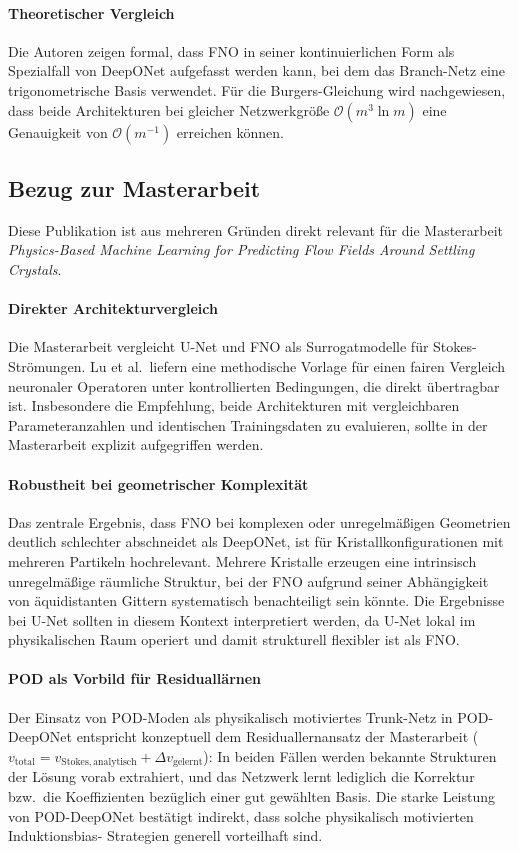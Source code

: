 \documentclass[a4paper,12pt]{article}
\begin{document}
\paragraph{Theoretischer Vergleich} Die Autoren zeigen formal, dass FNO
in seiner kontinuierlichen Form als Spezialfall von DeepONet aufgefasst
werden kann, bei dem das Branch-Netz eine trigonometrische Basis verwendet.
F\"ur die Burgers-Gleichung wird nachgewiesen, dass beide Architekturen bei
gleicher Netzwerkgr\"o\ss{}e $\mathcal{O}(m^3 \ln m)$ eine Genauigkeit von
$\mathcal{O}(m^{-1})$ erreichen k\"onnen.

\subsection*{Bezug zur Masterarbeit}

Diese Publikation ist aus mehreren Gr\"unden direkt relevant f\"ur die
Masterarbeit \emph{Physics-Based Machine Learning for Predicting Flow
Fields Around Settling Crystals}.

\paragraph{Direkter Architekturvergleich} Die Masterarbeit vergleicht
U-Net und FNO als Surrogatmodelle f\"ur Stokes-Str\"omungen. Lu et al.\ liefern
eine methodische Vorlage f\"ur einen fairen Vergleich neuronaler Operatoren
unter kontrollierten Bedingungen, die direkt \"ubertragbar ist. Insbesondere
die Empfehlung, beide Architekturen mit vergleichbaren Parameteranzahlen
und identischen Trainingsdaten zu evaluieren, sollte in der Masterarbeit
explizit aufgegriffen werden.

\paragraph{Robustheit bei geometrischer Komplexit\"at} Das zentrale Ergebnis,
dass FNO bei komplexen oder unregelm\"a\ss{}igen Geometrien deutlich schlechter
abschneidet als DeepONet, ist f\"ur Kristallkonfigurationen mit mehreren
Partikeln hochrelevant. Mehrere Kristalle erzeugen eine intrinsisch
unregelm\"a\ss{}ige r\"aumliche Struktur, bei der FNO aufgrund seiner
Abh\"angigkeit von \"aquidistanten Gittern systematisch benachteiligt sein
k\"onnte. Die Ergebnisse bei U-Net sollten in diesem Kontext interpretiert
werden, da U-Net lokal im physikalischen Raum operiert und damit strukturell
flexibler ist als FNO.

\paragraph{POD als Vorbild f\"ur Residuall\"arnen} Der Einsatz von POD-Moden
als physikalisch motiviertes Trunk-Netz in POD-DeepONet entspricht
konzeptuell dem Residuallernansatz der Masterarbeit ($v_\mathrm{total} =
v_\mathrm{Stokes,analytisch} + \Delta v_\mathrm{gelernt}$): In beiden
F\"allen werden bekannte Strukturen der L\"osung vorab extrahiert, und das
Netzwerk lernt lediglich die Korrektur bzw.\ die Koeffizienten bez\"uglich
einer gut gew\"ahlten Basis. Die starke Leistung von POD-DeepONet
best\"atigt indirekt, dass solche physikalisch motivierten Induktionsbias-
Strategien generell vorteilhaft sind.
\end{document}
